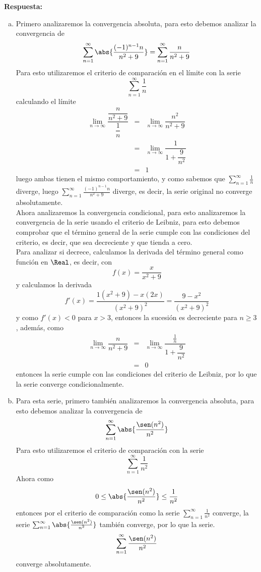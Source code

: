 \documentclass{article}
\begin{document}
\vspace{2mm}
\noindent\textbf{Respuesta:} 
\begin{enumerate}[a)]
  \item Primero analizaremos la convergencia absoluta, para esto debemos analizar la convergencia de
  $$\sum_{n=1}^{\infty}\abs{\dfrac{(-1)^{n-1}n}{n^2+9}}=\sum_{n=1}^{\infty}\dfrac{n}{n^2+9}$$
  Para esto utilizaremos el criterio de comparación en el límite con la serie
  $$\sum_{n=1}^{\infty}\dfrac{1}{n}$$
  calculando el límite
  \begin{eqnarray*}
    \lim_{n\to\infty}\dfrac{\dfrac{n}{n^2+9}}{\dfrac{1}{n}}&=&\lim_{n\to\infty}\dfrac{n^2}{n^2+9}\\
    &=&\lim_{n\to\infty}\dfrac{1}{1+\dfrac{9}{n^2}}\\
    &=&1
  \end{eqnarray*}
  luego ambas tienen el mismo comportamiento, y como sabemos que $\sum_{n=1}^{\infty}\frac{1}{n}$ diverge, luego $\sum_{n=1}^{\infty}\frac{(-1)^{n-1}n}{n^2+9}$ diverge, es decir, la serie original no converge absolutamente.\\
  Ahora analizaremos la convergencia condicional, para esto analizaremos la convergencia de la serie usando el criterio de Leibniz, para esto debemos comprobar que el término general de la serie cumple con las condiciones del criterio, es decir, que sea decreciente y que tienda a cero.\\
  Para analizar si decrece, calculamos la derivada del término general como función en $\Real$, es decir, con
  $$f(x)=\dfrac{x}{x^2+9}$$
  y calculamos la derivada
  $$f'(x)=\dfrac{1(x^2+9)-x(2x)}{(x^2+9)^2}=\dfrac{9-x^2}{(x^2+9)^2}$$
  y como $f'(x)<0$ para $x>3$, entonces la sucesión es decreciente para $n\geq 3$, además, como
  \begin{eqnarray*}
    \lim_{n\to\infty}\dfrac{n}{n^2+9}
      &=& \lim_{n\to\infty}\dfrac{\frac{1}{n}}{1+\dfrac{9}{n^2}}\\
      &=& 0
  \end{eqnarray*}
  entonces la serie cumple con las condiciones del criterio de Leibniz, por lo que la serie converge condicionalmente.\\

  \item Para esta serie, primero también analizaremos la convergencia absoluta, para esto debemos analizar la convergencia de
  $$\sum_{n=1}^{\infty}\abs{\dfrac{\sen(n^2)}{n^2}}$$
  Para esto utilizaremos el criterio de comparación con la serie
  $$\sum_{n=1}^{\infty}\dfrac{1}{n^2}$$
  Ahora como
  $$0\leq\abs{\dfrac{\sen(n^2)}{n^2}}\leq\dfrac{1}{n^2}$$
  entonces por el criterio de comparación como la serie $\sum_{n=1}^{\infty}\frac{1}{n^2}$ converge, la serie $\sum_{n=1}^{\infty}\abs{\frac{\sen(n^2)}{n^2}}$ también converge, por lo que la serie.
  $$\sum_{n=1}^{\infty}\dfrac{\sen(n^2)}{n^2}$$ 
  converge absolutamente.
\end{enumerate}
\end{document}

